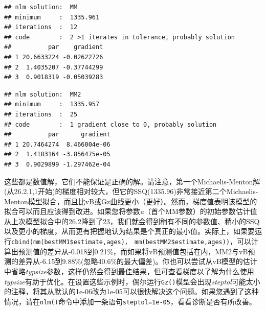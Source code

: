 \documentclass[
  lang=cn,
  11pt,
  scheme=chinese,
  chinesefont=nofont,
  citestyle=gb7714-2015,
  bibstyle=gb7714-2015]{elegantbook}
\newenvironment{Shaded}{\begin{snugshade}}{\end{snugshade}}
\newcommand{\AttributeTok}[1]{\textcolor[rgb]{0.13,0.29,0.53}{#1}}
\newcommand{\CommentTok}[1]{\textcolor[rgb]{0.56,0.35,0.01}{\textit{#1}}}
\newcommand{\ConstantTok}[1]{\textcolor[rgb]{0.56,0.35,0.01}{#1}}
\newcommand{\FloatTok}[1]{\textcolor[rgb]{0.00,0.00,0.81}{#1}}
\newcommand{\FunctionTok}[1]{\textcolor[rgb]{0.13,0.29,0.53}{\textbf{#1}}}
\newcommand{\NormalTok}[1]{#1}
\newcommand{\OtherTok}[1]{\textcolor[rgb]{0.56,0.35,0.01}{#1}}
\newcommand{\SpecialCharTok}[1]{\textcolor[rgb]{0.81,0.36,0.00}{\textbf{#1}}}
\newcommand{\StringTok}[1]{\textcolor[rgb]{0.31,0.60,0.02}{#1}}
\begin{document}
\begin{verbatim}
## nlm solution:  MM 
## minimum     :  1335.961 
## iterations  :  12 
## code        :  2 >1 iterates in tolerance, probably solution 
##          par    gradient
## 1 20.6633224 -0.02622726
## 2  1.4035207 -0.37744299
## 3  0.9018319 -0.05039283
\end{verbatim}

\begin{Shaded}
\end{Shaded}

\begin{verbatim}
## nlm solution:  MM2 
## minimum     :  1335.957 
## iterations  :  25 
## code        :  1 gradient close to 0, probably solution 
##          par      gradient
## 1 20.7464274  8.466004e-06
## 2  1.4183164 -3.856475e-05
## 3  0.9029899 -1.297462e-04
\end{verbatim}

这些都是数值解，它们不能保证是正确的解。请注意，第一个Michaelis-Menton解(从26.2,1,1开始)的梯度相对较大，但它的SSQ(1335.96)非常接近第二个Michaelis-Menton模型拟合，而且比vB或Gz曲线更小（更好）。然而，梯度值表明该模型的拟合可以而且应该得到改进。如果您将参数\emph{a}（首个MM参数）的初始参数估计值从上次模型拟合中的26.2降到了23，我们就会得到稍有不同的参数值、稍小的SSQ以及更小的梯度，从而更有把握地认为结果是个真正的最小值。实际上，如果要运行\texttt{cbind(mm(bestMM1\$estimate,ages)，\ mm(bestMM2\$estimate,ages))}，可以计算出预测值的差异从-0.018到0.21\%，而如果将vB预测值包括在内，MM2与vB预测的差异从-6.15到9.88\%(忽略40.6\%的最大偏差)。你也可以尝试从vB模型的估计中省略\emph{typsize}参数，这样仍然会得到最佳结果，但可查看梯度以了解为什么使用\emph{typsize}有助于优化。在设置这些示例时，偶尔运行\texttt{Gz()}模型会出现\emph{steptol}可能太小的注释，将其从默认的1e-06改为1e-05可以很快解决这个问题。如果您遇到了这种情况，请在\texttt{nlm()}命令中添加一条语句\texttt{steptol=1e-05}，看看诊断是否有所改善。
\end{document}
